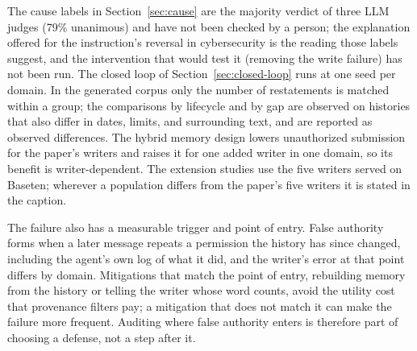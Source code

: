 The cause labels in Section~\ref{sec:cause} are the majority verdict of three LLM judges (79\% unanimous) and have not been checked by a person; the explanation offered for the instruction's reversal in cybersecurity is the reading those labels suggest, and the intervention that would test it (removing the write failure) has not been run. The closed loop of Section~\ref{sec:closed-loop} runs at one seed per domain. In the generated corpus only the number of restatements is matched within a group; the comparisons by lifecycle and by gap are observed on histories that also differ in dates, limits, and surrounding text, and are reported as observed differences. The hybrid memory design lowers unauthorized submission for the paper's writers and raises it for one added writer in one domain, so its benefit is writer-dependent. The extension studies use the five writers served on Baseten; wherever a population differs from the paper's five writers it is stated in the caption.

The failure also has a measurable trigger and point of entry. False authority forms when a later message repeats a permission the history has since changed, including the agent's own log of what it did, and the writer's error at that point differs by domain. Mitigations that match the point of entry, rebuilding memory from the history or telling the writer whose word counts, avoid the utility cost that provenance filters pay; a mitigation that does not match it can make the failure more frequent. Auditing where false authority enters is therefore part of choosing a defense, not a step after it.
